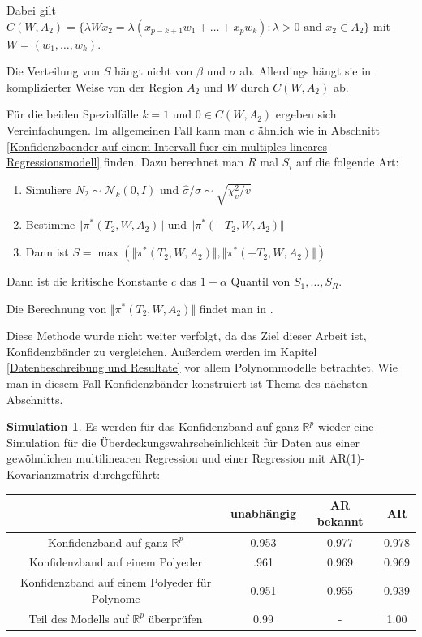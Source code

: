 \documentclass[12pt,a4paper]{article}
\theoremstyle{definition}
\theoremstyle{definition}
\theoremstyle{definition}
\newtheorem{Simulation}[Definition]{Simulation}
\theoremstyle{definition}
\newcommand{\UeberRR}{0.953}
\newcommand{\UeberRMinmax}{.961}
\newcommand{\UeberRMinmaxPolyfast}{0.951}
\newcommand{\UeberARbekanntR}{0.977}
\newcommand{\UeberARbekanntMinmax}{0.969}
\newcommand{\UeberARbekanntMinmaxPolyfast}{0.955}
\newcommand{\UeberARR}{0.978}
\newcommand{\UeberARMinmax}{0.969}
\newcommand{\UeberARMinmaxPolyfast}{0.939}
\newcommand{\UeberRRpruefen}{0.99}
\newcommand{\UeberARRpruefen}{1.00}
\begin{document}
Dabei gilt $C(W,A_2)=\{ \lambda W x_2 = \lambda(x_{p-k+1} w_1 + \ldots + x_p w_k) : \lambda > 0 \text{ and } x_2 \in A_2 \}$ mit $W=(w_1, \ldots, w_k)$. 

Die Verteilung von $S$ hängt nicht von $\beta$ und $\sigma$ ab. Allerdings hängt sie in komplizierter Weise von der Region $A_2$ und $W$ durch $C(W,A_2)$ ab.

Für die beiden Spezialfälle $k=1$ und $0 \in C(W,A_2)$ ergeben sich Vereinfachungen. Im allgemeinen Fall kann man $c$ ähnlich wie in Abschnitt \ref{Konfidenzbaender auf einem Intervall fuer ein multiples lineares Regressionsmodell} finden. Dazu berechnet man $R$ mal $S_i$ auf die folgende Art:

\begin{enumerate}
\item Simuliere $N_2 \sim \mathscr{N}_{k}(0,I)$ und $\hat{\sigma}/\sigma \sim \sqrt{\chi^2_v/v}$
\item Bestimme $\Vert \pi^{*}(T_2,W,A_2) \Vert$ und $\Vert \pi^{*}(-T_2,W,A_2) \Vert$
\item Dann ist $S= \max(\Vert \pi^{*}(T_2,W,A_2) \Vert, \Vert \pi^{*}(-T_2,W,A_2) \Vert )$
\end{enumerate}

Dann ist die kritische Konstante $c$ das $1-\alpha$ Quantil von $S_1, \ldots, S_R$.

Die Berechnung von $\Vert \pi^{*}(T_2,W,A_2) \Vert$ findet man in \cite[Appendix B]{Liu64}.

Diese Methode wurde nicht weiter verfolgt, da das Ziel dieser Arbeit ist, Konfidenzbänder zu vergleichen. Außerdem werden im Kapitel \ref{Datenbeschreibung und Resultate} vor allem Polynommodelle betrachtet. Wie man in diesem Fall Konfidenzbänder konstruiert ist Thema des nächsten Abschnitts.

\begin{Simulation}
Es werden für das Konfidenzband auf ganz $\mathbb{R}^{p}$ wieder eine Simulation für die Überdeckungswahrscheinlichkeit für Daten aus einer gewöhnlichen multilinearen Regression und einer Regression mit AR(1)-Kovarianzmatrix durchgeführt:


\begin{center}
\begin{tabular}{|c|c|c|c|}
\hline 
 & unabhängig & AR bekannt & AR \\ 
\hline 
Konfidenzband auf ganz $\mathbb{R}^{p}$		 & \UeberRR		  & \UeberARbekanntR & \UeberARR \\ 
\hline 
Konfidenzband auf einem Polyeder	 & \UeberRMinmax  & \UeberARbekanntMinmax & \UeberARMinmax \\ 
\hline 
Konfidenzband auf einem Polyeder für Polynome  & \UeberRMinmaxPolyfast & \UeberARbekanntMinmaxPolyfast & \UeberARMinmaxPolyfast \\ 
\hline 
 Teil des Modells auf $\mathbb{R}^{p}$ überprüfen 	& \UeberRRpruefen & - & \UeberARRpruefen \\ 
\hline 
\end{tabular} 
\end{center}

\end{Simulation}
\end{document}

